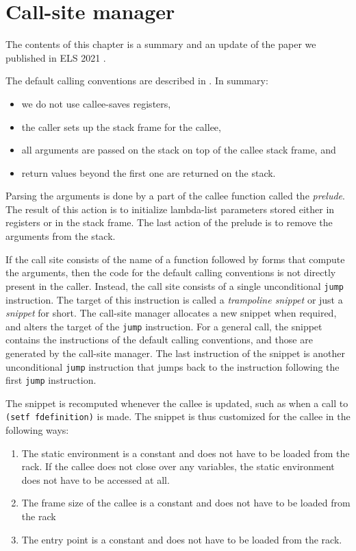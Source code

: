 \chapter{Call-site manager}
\label{chap-call-site-manager}

The contents of this chapter is a summary and an update of the paper
we published in ELS 2021 \cite{DBLP:conf/els/Strandh21}.

The default calling conventions are described in
.  In summary:

\begin{itemize}
\item we do not use callee-saves registers,
\item the caller sets up the stack frame for the callee,
\item all arguments are passed on the stack on top of the callee stack
  frame, and
\item return values beyond the first one are returned on the stack.
\end{itemize}

Parsing the arguments is done by a part of the callee function
called the \emph{prelude}.  The result of this action is to initialize
lambda-list parameters stored either in registers or in the stack
frame.  The last action of the prelude is to remove the arguments from
the stack.

If the call site consists of the name of a function followed by forms
that compute the arguments, then the code for the default calling
conventions is not directly present in the caller.  Instead, the call
site consists of a single unconditional \texttt{jump} instruction.
The target of this instruction is called a \emph{trampoline snippet}
or just a \emph{snippet} for short.  The call-site manager allocates a
new snippet when required, and alters the target of the \texttt{jump}
instruction.  For a general call, the snippet contains the
instructions of the default calling conventions, and those are
generated by the call-site manager.  The last instruction of the
snippet is another unconditional \texttt{jump} instruction that jumps
back to the instruction following the first \texttt{jump} instruction.

The snippet is recomputed whenever the callee is updated, such as when
a call to \texttt{(setf fdefinition)} is made.  The snippet is thus
customized for the callee in the following ways:

\begin{enumerate}
\item The static environment is a constant and does not have to be
  loaded from the rack.  If the callee does not close over any
  variables, the static environment does not have to be accessed at
  all.
\item The frame size of the callee is a constant and does not
  have to be loaded from the rack
\item The entry point is a constant and does not have to be loaded
  from the rack.
\end{enumerate}

